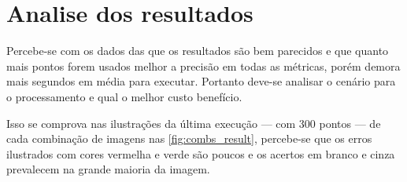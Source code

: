 \section{Analise dos resultados}

Percebe-se com os dados das  que os resultados são bem parecidos e que quanto mais pontos forem usados melhor a precisão em todas as métricas, porém demora mais segundos em média para executar. Portanto deve-se analisar o cenário para o processamento e qual o melhor custo benefício.

Isso se comprova nas ilustrações da última execução — com 300 pontos — de cada combinação de imagens nas \cref{fig:combs_result}, percebe-se que os erros ilustrados com cores vermelha e verde são poucos e os acertos em branco e cinza prevalecem na grande maioria da imagem.




